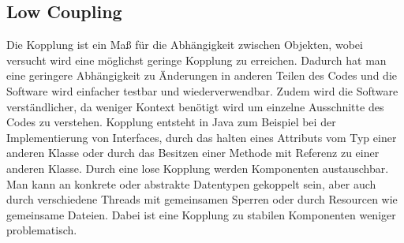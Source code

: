 \subsection{Low Coupling}
Die Kopplung ist ein Maß für die Abhängigkeit zwischen Objekten, wobei versucht wird eine möglichst geringe Kopplung zu erreichen.
Dadurch hat man eine geringere Abhängigkeit zu Änderungen in anderen Teilen des Codes und die Software wird einfacher testbar und wiederverwendbar.
Zudem wird die Software verständlicher, da weniger Kontext benötigt wird um einzelne Ausschnitte des Codes zu verstehen.
Kopplung entsteht in Java zum Beispiel bei der Implementierung von Interfaces,
durch das halten eines Attributs vom Typ einer anderen Klasse oder durch das Besitzen einer Methode mit Referenz zu einer anderen Klasse.
Durch eine lose Kopplung werden Komponenten austauschbar.
Man kann an konkrete oder abstrakte Datentypen gekoppelt sein, aber auch durch verschiedene Threads mit gemeinsamen Sperren oder durch Resourcen wie gemeinsame Dateien.
Dabei ist eine Kopplung zu stabilen Komponenten weniger problematisch.

